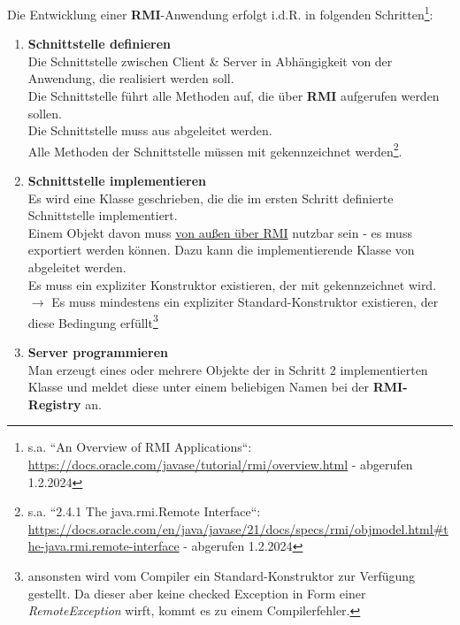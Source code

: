\noindent
Die Entwicklung einer \textbf{RMI}-Anwendung erfolgt i.d.R. in folgenden Schritten\footnote{
s.a. ``An Overview of RMI Applications``: \url{https://docs.oracle.com/javase/tutorial/rmi/overview.html} - abgerufen 1.2.2024
}:

\begin{enumerate}
    \item\label{itm:intdef} \textbf{Schnittstelle definieren}\\
    \noindent
    Die Schnittstelle zwischen Client \& Server in Abhängigkeit von der Anwendung, die realisiert werden soll.\\
    \noindent
    Die Schnittstelle führt alle Methoden auf, die über \textbf{RMI} aufgerufen werden sollen.\\
    \noindent
    Die Schnittstelle muss aus  abgeleitet werden.\\
    \noindent
    Alle Methoden der Schnittstelle müssen mit  gekennzeichnet werden\footnote{
    s.a. ``2.4.1 The java.rmi.Remote Interface``: \url{https://docs.oracle.com/en/java/javase/21/docs/specs/rmi/objmodel.html#the-java.rmi.remote-interface} - abgerufen 1.2.2024
    }.

    \item \textbf{Schnittstelle implementieren}\\
    \noindent
    Es wird eine Klasse geschrieben, die die im ersten Schritt definierte Schnittstelle implementiert.\\
    \noindent
    Einem Objekt davon muss \ul{von außen über RMI} nutzbar sein - es muss exportiert werden können.
    Dazu kann die implementierende Klasse von  abgeleitet werden.\\
    Es muss ein expliziter Konstruktor existieren, der mit  gekennzeichnet wird. \\
    $\rightarrow$ Es muss mindestens ein expliziter Standard-Konstruktor existieren, der diese Bedingung erfüllt\footnote{
    ansonsten wird vom Compiler ein Standard-Konstruktor zur Verfügung gestellt.
    Da dieser aber keine checked Exception in Form einer \textit{RemoteException} wirft, kommt es zu einem Compilerfehler.
    }

    \item \textbf{Server programmieren}\\
    \noindent
    Man erzeugt eines oder mehrere Objekte der in Schritt 2 implementierten Klasse und meldet diese unter einem beliebigen Namen bei der \textbf{RMI-Registry} an.


\end{enumerate}
